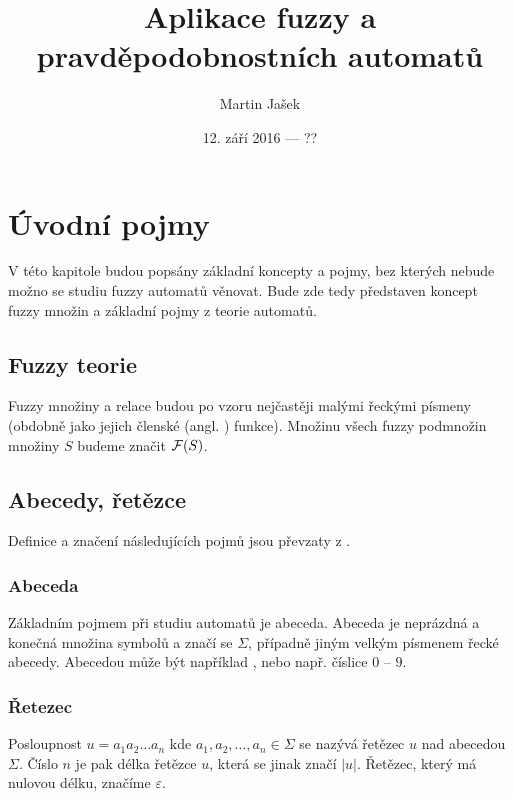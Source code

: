 \documentclass[a4paper,10pt]{article}
\title{Aplikace fuzzy a pravděpodobnostních automatů}
\author{Martin Jašek}
\date{12. září 2016 --- ??}
\begin{document}
\maketitle
\tableofcontents
\newpage

\section{Úvodní pojmy}
V této kapitole budou popsány základní koncepty a pojmy, bez kterých nebude možno se studiu fuzzy automatů věnovat. Bude zde tedy představen koncept fuzzy množin a základní pojmy z teorie automatů.

\subsection{Fuzzy teorie}

Fuzzy množiny a relace budou po vzoru \cite{AstGonMenGar-FuzzAutEpsMovCmpFuzzMeasBtwStrs} nejčastěji malými řeckými písmeny (obdobně jako jejich členské (angl. ) funkce). Množinu všech fuzzy podmnožin množiny $S$ budeme značit $\mathcal{F}(S)$.

\subsection{Abecedy, řetězce}
Definice a značení následujících pojmů jsou převzaty z \cite{Koz-AutComp}.

\subsubsection*{Abeceda}
Základním pojmem při studiu automatů je abeceda. Abeceda je neprázdná a konečná množina symbolů a značí se $\Sigma$, případně jiným velkým písmenem řecké abecedy. Abecedou může být například , nebo např. číslice $0$ -- $9$.

\subsubsection*{Řetezec}
Posloupnost $u = a_1 a_2 \dots a_n$ kde $a_1,  a_2, \dots, a_n \in \Sigma$ se nazývá řetězec $u$ nad abecedou $\Sigma$. Číslo $n$ je pak délka řetězce $u$, která se jinak značí $|u|$. Řetězec, který má nulovou délku, značíme $\varepsilon$.
\end{document}

